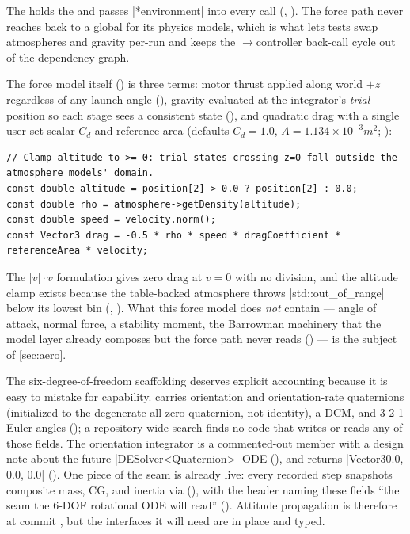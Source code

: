 \begin{designrule}
The  holds the  and passes \cppinline|*environment| into every
 call (, ). The force path
never reaches back to a global for its physics models, which is what lets tests swap atmospheres
and gravity per-run and keeps the $\rightarrow$controller back-call cycle out of the
dependency graph.
\end{designrule}

The force model itself () is three terms: motor thrust applied
along world $+z$ regardless of any launch angle (), gravity
evaluated at the integrator's \emph{trial} position so each stage sees a consistent state
(), and quadratic drag with a single user-set scalar $C_d$ and
reference area (defaults $C_d=1.0$, $A=1.134\times10^{-3}\unit{m^2}$;
):

\begin{verbatim}
// Clamp altitude to >= 0: trial states crossing z=0 fall outside the atmosphere models' domain.
const double altitude = position[2] > 0.0 ? position[2] : 0.0;
const double rho = atmosphere->getDensity(altitude);
const double speed = velocity.norm();
const Vector3 drag = -0.5 * rho * speed * dragCoefficient * referenceArea * velocity;
\end{verbatim}

\noindent The $|v|\cdot v$ formulation gives zero drag at $v=0$ with no division, and the altitude
clamp exists because the table-backed atmosphere throws \cppinline|std::out_of_range| below its
lowest bin (, ). What this force model does
\emph{not} contain --- angle of attack, normal force, a stability moment, the Barrowman machinery
that the model layer already composes but the force path never reads
() --- is the subject of \cref{sec:aero}.

The six-degree-of-freedom scaffolding deserves explicit accounting because it is easy to mistake
for capability.  carries orientation and orientation-rate quaternions (initialized
to the degenerate all-zero quaternion, not identity), a DCM, and 3-2-1 Euler angles
(); a repository-wide search finds no code that writes or reads any of
those fields. The orientation integrator is a commented-out member with a design note about the
future \cppinline|DESolver<Quaternion>| ODE (), and
 returns \cppinline|Vector3{0.0, 0.0, 0.0}|
(). One piece of the seam is already live: every recorded step
snapshots composite mass, CG, and inertia via 
(), with the header naming these fields ``the seam the 6-DOF
rotational ODE will read'' (). Attitude propagation is therefore
\fabsent{} at commit , but the interfaces it will need are in place and typed.

